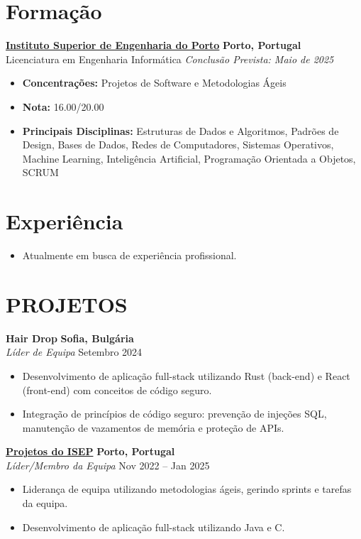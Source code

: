 \documentclass[10pt, letterpaper]{article}
\newenvironment{highlights}{
    \begin{itemize}[
        topsep=0.10 cm,
        parsep=0.10 cm,
        partopsep=0pt,
        itemsep=0pt,
        leftmargin=1cm %
    ]
}{
    \end{itemize}
}
\newenvironment{subhighlights}{
    \begin{itemize}[
        topsep=0.10 cm,
        parsep=0.10 cm,
        partopsep=0pt,
        itemsep=0pt,
        leftmargin=1.5cm, %
        label=$\vcenter{\hbox{\scriptsize$\circ$}}$ %
    ]
}{
    \end{itemize}
}
\begin{document}
\section{Formação}
\textbf{\href{https://www.isep.ipp.pt}{Instituto Superior de Engenharia do Porto}} \hfill \textbf{Porto, Portugal} \\
Licenciatura em Engenharia Informática \hfill \textit{Conclusão Prevista: Maio de 2025} \\
\begin{subhighlights}
    \item \textbf{Concentrações:} Projetos de Software e Metodologias Ágeis
    \item \textbf{Nota:} 16.00/20.00
    \item \textbf{Principais Disciplinas:} Estruturas de Dados e Algoritmos, Padrões de Design, Bases de Dados, 
    Redes de Computadores, Sistemas Operativos, Machine Learning, Inteligência Artificial, Programação Orientada a Objetos, SCRUM
\end{subhighlights}

\section{Experiência}
\begin{highlights}
    \item Atualmente em busca de experiência profissional.
\end{highlights}
\section{PROJETOS}
\textbf{Hair Drop} \hfill \textbf{Sofia, Bulgária} \\
\textit{Líder de Equipa} \hfill Setembro 2024 \\
\begin{highlights}
    \item Desenvolvimento de aplicação full-stack utilizando Rust (back-end) e React (front-end) com conceitos de código seguro.
    \item Integração de princípios de código seguro: prevenção de injeções SQL, manutenção de vazamentos de memória e proteção de APIs.
\end{highlights}

\textbf{\href{https://purenimble.github.io/projects}{Projetos do ISEP}} \hfill \textbf{Porto, Portugal} \\
\textit{Líder/Membro da Equipa} \hfill Nov 2022 – Jan 2025 \\
\begin{highlights}
    \item Liderança de equipa utilizando metodologias ágeis, gerindo sprints e tarefas da equipa.
    \item Desenvolvimento de aplicação full-stack utilizando Java e C.
\end{highlights}
\end{document}
